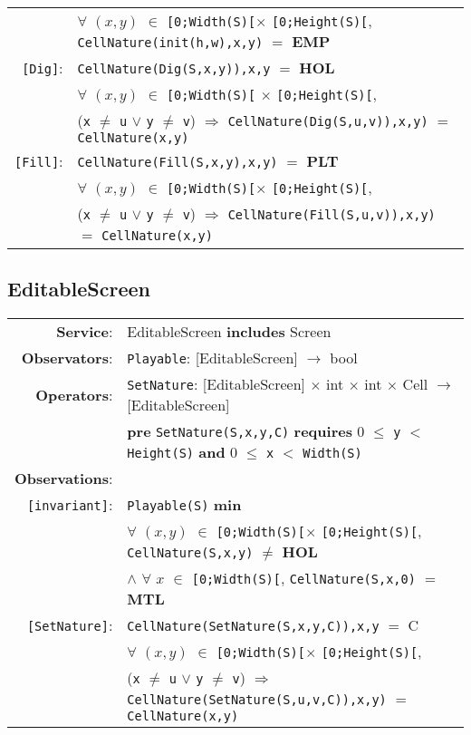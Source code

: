 \documentclass[8pt]{article}
\begin{document}
{\begin{longtable}{rl}
  & $\forall$ $(x,y)$ $\in$ \texttt{[0;Width(S)[}$\times$ \texttt{[0;Height(S)[},~ \texttt{CellNature(init(h,w),x,y)} $=$ \textbf{EMP} \\
  \texttt{[Dig]}: & \texttt{CellNature(Dig(S,x,y)),x,y} $=$ \textbf{HOL} \\
  & $\forall$ $(x,y)$ $\in$ \texttt{[0;Width(S)[} $\times$ \texttt{[0;Height(S)[}, \\
  & \quad\quad\quad\quad (\texttt{x} $\neq$ \texttt{u} $\lor$ \texttt{y} $\neq$ \texttt{v}) $\Rightarrow$ \texttt{CellNature(Dig(S,u,v)),x,y)} $=$ \texttt{CellNature(x,y)} \\
  \texttt{[Fill]}: & \texttt{CellNature(Fill(S,x,y),x,y)} $=$ \textbf{PLT} \\
  & $\forall$ $(x,y)$ $\in$ \texttt{[0;Width(S)[}$\times$ \texttt{[0;Height(S)[}, \\
  & \quad\quad\quad\quad (\texttt{x} $\neq$ \texttt{u} $\lor$ \texttt{y} $\neq$ \texttt{v}) $\Rightarrow$ \texttt{CellNature(Fill(S,u,v)),x,y)} $=$ \texttt{CellNature(x,y)} \\
\end{longtable}}

\subsection{EditableScreen}

{\small
\begin{longtable}{rl}
  \textbf{Service}: & \textrm{EditableScreen} {\bf includes} \textrm{Screen}  \\
  \textbf{Observators}: & \texttt{Playable}: \textrm{[EditableScreen]} $\rightarrow$ \textrm{bool} \\
  \textbf{Operators}: & \texttt{SetNature}: \textrm{[EditableScreen]} $\times$ \textrm{int} $\times$ \textrm{int} $\times$ \textrm{Cell}  $\rightarrow$ \textrm{[EditableScreen]} \\
  & \quad \textbf{pre } \texttt{SetNature(S,x,y,C)} \textbf{ requires } 0 $\leq$ \texttt{y} $<$ \texttt{Height(S)} \textbf{ and } 0 $\leq$ \texttt{x} $<$ \texttt{Width(S)}\\
  \textbf{Observations}: \\
  \texttt{[invariant]}: & \texttt{Playable(S)} \textbf{min} \\
  & \quad\quad\quad\quad $\forall$ $(x,y)$ $\in$ \texttt{[0;Width(S)[}$\times$ \texttt{[0;Height(S)[}, \texttt{CellNature(S,x,y)} $\neq$ \textbf{HOL}  \\
          & \quad\quad\quad\quad $\land$ $\forall$ $x$ $\in$ \texttt{[0;Width(S)[}, \texttt{CellNature(S,x,0)} $=$ \textbf{MTL}  \\
              \texttt{[SetNature]}: & \texttt{CellNature(SetNature(S,x,y,C)),x,y} $=$ C \\
              & $\forall$ $(x,y)$ $\in$ \texttt{[0;Width(S)[}$\times$ \texttt{[0;Height(S)[}, \\ & \quad\quad\quad\quad (\texttt{x} $\neq$ \texttt{u} $\lor$ \texttt{y} $\neq$ \texttt{v}) $\Rightarrow$ \texttt{CellNature(SetNature(S,u,v,C)),x,y)} $=$ \texttt{CellNature(x,y)} \\
\end{longtable}}
\end{document}
